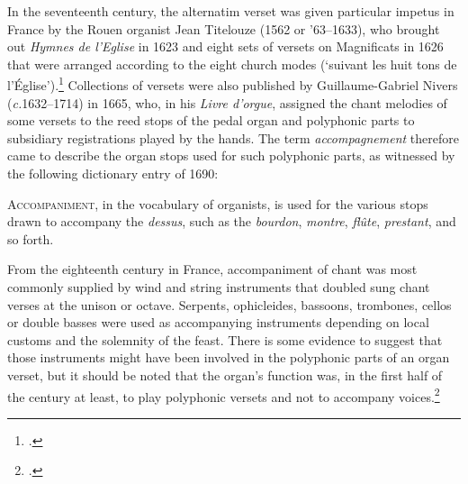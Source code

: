 In the seventeenth century, the alternatim verset was given particular impetus in France by the Rouen organist Jean Titelouze (1562 or '63--1633), who brought out \emph{Hymnes de l'Eglise} in 1623 and eight sets of versets on Magnificats in 1626 that were arranged according to the eight church modes (`suivant les huit tons de l'Église').\footcites{TitelouzeHymnesEglisepour1623}{TitelouzeMagnificatoucantique1626}
%
Collections of versets were also published by Guillaume-Gabriel Nivers (\emph{c.}1632--1714) in 1665, who, in his \emph{Livre d'orgue}, assigned the chant melodies of some versets to the reed stops of the pedal organ and polyphonic parts to subsidiary registrations played by the hands.
The term \emph{accompagnement} therefore came to describe the organ stops used for such polyphonic parts, as witnessed by the following dictionary entry of 1690:

  {\cite[unpaginated entry under `ACC']{FuretiereDictionnaireuniverselcontenant1690}}
{\textsc{Accompaniment}, in the vocabulary of organists, is used for the various stops drawn to accompany the \emph{dessus}, such as the \emph{bourdon}, \emph{montre}, \emph{flûte}, \emph{prestant}, and so forth.}

\pagebreak{}
\noindent
From the eighteenth century in France, accompaniment of chant was most commonly supplied by wind and string instruments that doubled sung chant verses at the unison or octave.
Serpents, ophicleides, bassoons, trombones, cellos or double basses were used as accompanying instruments depending on local customs and the solemnity of the feast.
There is some evidence to suggest that those instruments might have been involved in the polyphonic parts of an organ verset, but it should be noted that the organ's function was, in the first half of the century at least, to play polyphonic versets and not to accompany voices.\footcite[10--11]{HillsmanInstrumentalAccompanimentPlainChant1980}

